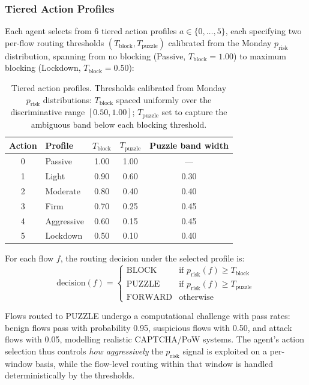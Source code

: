 \documentclass[sigconf,nonacm]{acmart}
\begin{document}
\subsubsection{Tiered Action Profiles}
\label{sec:tiers}

Each agent selects from 6 tiered action profiles $a \in \{0, \ldots, 5\}$, each specifying two per-flow routing thresholds $(T_\text{block}, T_\text{puzzle})$ calibrated from the Monday $p_\text{risk}$ distribution, spanning from no blocking (Passive, $T_\text{block}=1.00$) to maximum blocking (Lockdown, $T_\text{block}=0.50$):

\begin{table}[h]
\centering
\small
\caption{Tiered action profiles. Thresholds calibrated from Monday $p_\text{risk}$ distributions: $T_\text{block}$ spaced uniformly over the discriminative range $[0.50, 1.00]$; $T_\text{puzzle}$ set to capture the ambiguous band below each blocking threshold.}
\label{tab:profiles}
\begin{tabular}{clccc}
\toprule
Action & Profile & $T_\text{block}$ & $T_\text{puzzle}$ & Puzzle band width \\
\midrule
0 & Passive    & 1.00 & 1.00 & --- \\
1 & Light      & 0.90 & 0.60 & 0.30 \\
2 & Moderate   & 0.80 & 0.40 & 0.40 \\
3 & Firm       & 0.70 & 0.25 & 0.45 \\
4 & Aggressive & 0.60 & 0.15 & 0.45 \\
5 & Lockdown   & 0.50 & 0.10 & 0.40 \\
\bottomrule
\end{tabular}
\end{table}

For each flow $f$, the routing decision under the selected profile is:
\begin{equation}
    \text{decision}(f) = \begin{cases}
        \text{BLOCK}   & \text{if } p_\text{risk}(f) \geq T_\text{block} \\
        \text{PUZZLE}  & \text{if } p_\text{risk}(f) \geq T_\text{puzzle} \\
        \text{FORWARD} & \text{otherwise}
    \end{cases}
    \label{eq:routing}
\end{equation}

Flows routed to PUZZLE undergo a computational challenge with pass rates: benign flows pass with probability 0.95, suspicious flows with 0.50, and attack flows with 0.05, modelling realistic CAPTCHA/PoW systems. The agent's action selection thus controls \emph{how aggressively} the $p_\text{risk}$ signal is exploited on a per-window basis, while the flow-level routing within that window is handled deterministically by the thresholds.
\end{document}
